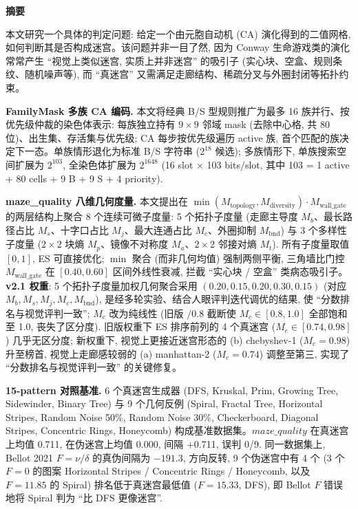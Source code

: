 
\begin{center}
{\large\bfseries\textcolor{Vermilion}{摘\quad 要}}
\end{center}

\noindent
本文研究一个具体的判定问题: 给定一个由元胞自动机 (CA) 演化得到的二值网格, 如何判断其是否构成迷宫。该问题并非一目了然, 因为 Conway 生命游戏类的演化常常产生 ``视觉上类似迷宫, 实质上并非迷宫'' 的吸引子 (实心块、空盒、规则条纹、随机噪声等), 而 ``真迷宫'' 又需满足走廊结构、稀疏分叉与外圈封闭等拓扑约束。

\noindent\textbf{FamilyMask 多族 CA 编码.} 本文将经典 B/S 型规则推广为最多 16 族并行、按优先级仲裁的染色体表示: 每族独立持有 $9 \times 9$ 邻域 mask (去除中心格, 共 80 位)、出生集、存活集与优先级; CA 每步按优先级遍历 active 族, 首个匹配的族决定下一态。单族情形退化为标准 B/S 字符串 ($2^{18}$ 候选); 多族情形下, 单族搜索空间扩展为 $2^{103}$, 全染色体扩展为 $2^{1648}$ (16 slot $\times$ 103 bits/slot, 其中 103 = 1 active + 80 cells + 9 B + 9 S + 4 priority).

\noindent\textbf{maze\_quality 八维几何度量.} 本文提出在 $\min(M_{\text{topology}}, M_{\text{diversity}}) \cdot M_{\text{wall\_gate}}$ 的两层结构上聚合 8 个连续可微子度量: 5 个拓扑子度量 (走廊主导度 $M_b$、最长路径占比 $M_s$、十字口占比 $M_j$、最大连通占比 $M_c$、外圈抑制 $M_{\text{bnd}}$) 与 3 个多样性子度量 ($2 \times 2$ 块熵 $M_p$、镜像不对称度 $M_a$、$2 \times 2$ 邻接对熵 $M_t$). 所有子度量取值 $[0, 1]$, ES 可直接优化; $\min$ 聚合 (而非几何均值) 强制两侧平衡, 三角墙比门控 $M_{\text{wall\_gate}}$ 在 $[0.40, 0.60]$ 区间外线性衰减, 拦截 ``实心块 / 空盒'' 类病态吸引子。\textbf{v2.1 权重}: 5 个拓扑子度量加权几何聚合采用 $(0.20, 0.15, 0.20, 0.30, 0.15)$ (对应 $M_b, M_s, M_j, M_c, M_{\text{bnd}}$), 是经多轮实验、结合人眼评判迭代调优的结果, 使 ``分数排名与视觉评判一致''; $M_c$ 改为纯线性 (旧版 $/0.8$ 截断使 $M_c \in [0.8, 1.0]$ 全部饱和至 1.0, 丧失了区分度). 旧版权重下 ES 排序前列的 4 个真迷宫 ($M_c \in [0.74, 0.98]$) 几乎无区分度; 新权重下, 视觉上更接近迷宫形态的 (b) chebyshev-1 ($M_c = 0.98$) 升至榜首, 视觉上走廊感较弱的 (a) manhattan-2 ($M_c = 0.74$) 调整至第三, 实现了 ``分数排名与视觉评判一致'' 的关键修复。

\noindent\textbf{15-pattern 对照基准.} 6 个真迷宫生成器 (DFS, Kruskal, Prim, Growing Tree, Sidewinder, Binary Tree) 与 9 个几何反例 (Spiral, Fractal Tree, Horizontal Stripes, Random Noise 50\%, Random Noise 30\%, Checkerboard, Diagonal Stripes, Concentric Rings, Honeycomb) 构成基准数据集。$maze\_quality$ 在真迷宫上均值 0.711, 在伪迷宫上均值 0.000, 间隔 +0.711, 误判 0/9. 同一数据集上, Bellot 2021 $F = \nu / \delta$ 的真伪间隔为 $-191.3$, 方向反转, 9 个伪迷宫中有 4 个 (3 个 $F = 0$ 的图案 Horizontal Stripes / Concentric Rings / Honeycomb, 以及 $F = 11.85$ 的 Spiral) 排名低于真迷宫最低值 ($F = 15.33$, DFS), 即 Bellot $F$ 错误地将 Spiral 判为 ``比 DFS 更像迷宫''.

